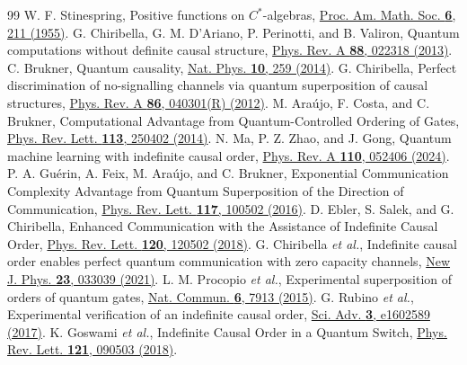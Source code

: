 \documentclass[11pt]{article}
\begin{document}
\begin{thebibliography}{99}
 W. F. Stinespring, Positive functions on $C^*$-algebras, \href{https://doi.org/10.1090/S0002-9939-1955-0069403-4}{Proc. Am. Math. Soc. \textbf{6}, 211 (1955)}.
 G. Chiribella, G. M. D'Ariano, P. Perinotti, and B. Valiron, Quantum computations without definite causal structure, \href{https://doi.org/10.1103/PhysRevA.88.022318}{Phys. Rev. A \textbf{88}, 022318 (2013)}.
 C. Brukner, Quantum causality, \href{https://doi.org/10.1038/nphys2930}{Nat. Phys. \textbf{10}, 259 (2014)}.
 G. Chiribella, Perfect discrimination of no-signalling channels via quantum superposition of causal structures, \href{https://doi.org/10.1103/PhysRevA.86.040301}{Phys. Rev. A \textbf{86}, 040301(R) (2012)}.
 M. Ara\'{u}jo, F. Costa, and C. Brukner, Computational Advantage from Quantum-Controlled Ordering of Gates, \href{https://doi.org/10.1103/PhysRevLett.113.250402}{Phys. Rev. Lett. \textbf{113}, 250402 (2014)}.
 N. Ma, P. Z. Zhao, and J. Gong, Quantum machine learning with indefinite causal order, \href{https://doi.org/10.1103/PhysRevA.110.052406}{Phys. Rev. A \textbf{110}, 052406 (2024)}.
 P. A. Gu\'{e}rin, A. Feix, M. Ara\'{u}jo, and C. Brukner, Exponential Communication Complexity Advantage from Quantum Superposition of the Direction of Communication, \href{https://doi.org/10.1103/PhysRevLett.117.100502}{Phys. Rev. Lett. \textbf{117}, 100502 (2016)}.
 D. Ebler, S. Salek, and G. Chiribella, Enhanced Communication with the Assistance of Indefinite Causal Order, \href{https://doi.org/10.1103/PhysRevLett.120.120502}{Phys. Rev. Lett. \textbf{120}, 120502 (2018)}.
 G. Chiribella \emph{et al.}, Indefinite causal order enables perfect quantum communication with zero capacity channels, \href{https://doi.org/10.1088/1367-2630/abe7a0}{New J. Phys. \textbf{23}, 033039 (2021)}.
 L. M. Procopio \emph{et al.}, Experimental superposition of orders of quantum gates, \href{https://doi.org/10.1038/ncomms8913}{Nat. Commun. \textbf{6}, 7913 (2015)}.
 G. Rubino \emph{et al.}, Experimental verification of an indefinite causal order, \href{https://doi.org/10.1126/sciadv.1602589}{Sci. Adv. \textbf{3}, e1602589 (2017)}.
 K. Goswami \emph{et al.}, Indefinite Causal Order in a Quantum Switch, \href{https://doi.org/10.1103/PhysRevLett.121.090503}{Phys. Rev. Lett. \textbf{121}, 090503 (2018)}.

\end{thebibliography}
\end{document}
